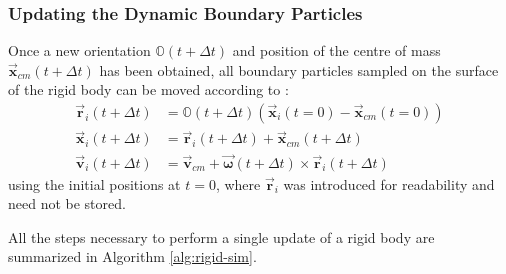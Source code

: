 \documentclass[oneside, a4paper]{book}
\newcommand\vek[1]{\vec{\bm{#1}}}
\newcommand\br[1]{\left(#1\right)}
\begin{document}
    \subsubsection{Updating the Dynamic Boundary Particles}
    Once a new orientation $\mathds{O}\br{t+\Delta t}$ and position of the centre of mass $\vek{x}_{cm}\br{t+\Delta t}$ has been obtained, all boundary particles sampled on the surface of the rigid body can be moved according to \autocite{physically-based-rigids}:
    \begin{align}
      \vek{r}_i\br{t+\Delta t} &= \mathds{O}\br{t+\Delta t} \br{\vek{x}_i\br{t=0} - \vek{x}_{cm}\br{t=0}}\\
      \vek{x}_i\br{t+\Delta t} &= \vek{r}_i\br{t+\Delta t} + \vek{x}_{cm}\br{t+\Delta t}\label{eq:rigid-update-particle-x}\\
      \vek{v}_i\br{t+\Delta t} &= \vek{v}_{cm} + \vek{\omega}\br{t+\Delta t} \times \vek{r}_i\br{t+\Delta t}\label{eq:rigid-update-particle-v}
    \end{align}
    using the initial positions at $t=0$, where $\vek{r}_i$ was introduced for readability and need not be stored. 

    All the steps necessary to perform a single update of a rigid body are summarized in Algorithm \ref{alg:rigid-sim}.
\end{document}

